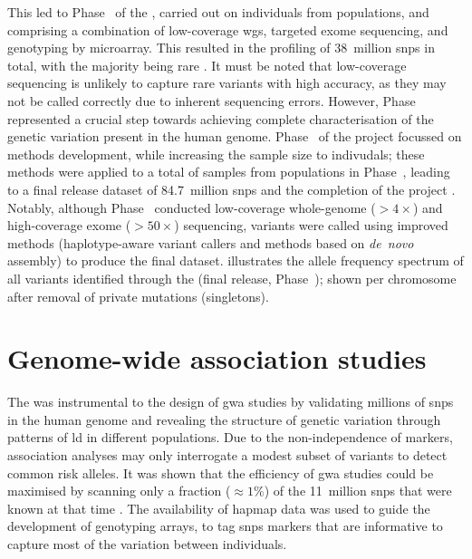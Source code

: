 This led to Phase~ of the , carried out on  individuals from  populations, and comprising a combination of low-coverage \gls{wgs}, targeted exome sequencing, and genotyping by microarray.
This resulted in the profiling of 38~million \glspl{snp} in total, with the majority being rare \citep{GenomesProjectConsortium:2012co}.
It must be noted that low-coverage sequencing is unlikely to capture rare variants with high accuracy, as they may not be called correctly due to inherent sequencing errors.
However, Phase~ represented a crucial step towards achieving complete characterisation of the genetic variation present in the human genome.
Phase~ of the project focussed on methods development, while increasing the sample size to  indivudals; these methods were applied to a total of  samples from  populations in Phase~, leading to a final release dataset of 84.7~million \glspl{snp} and the completion of the project \citep{Auton:2015gk}.
Notably, although Phase~ conducted low-coverage whole-genome ($>4\times$) and high-coverage exome ($>50\times$) sequencing, variants were called using improved methods (\eg haplotype-aware variant callers and methods based on \emph{de~novo} assembly) to produce the final dataset.
 illustrates the allele frequency spectrum of all variants identified through the  (final release, Phase~); shown per chromosome after removal of private mutations (singletons).



%
\section{Genome-wide association studies}
\label{sec:gwas_intro}
%

The  was instrumental to the design of \gls{gwa} studies by validating millions of \glspl{snp} in the human genome and revealing the structure of genetic variation through patterns of \gls{ld} in different populations.
Due to the non-independence of markers, association analyses may only interrogate a modest subset of variants to detect common risk alleles.
It was shown that the efficiency of \gls{gwa} studies could be maximised by scanning only a fraction (${\approx 1\%}$) of the 11~million \glspl{snp} that were known at that time \citep{deBakker:2005cy,Peer:2006bk}.
The availability of \gls{hapmap} data was used to guide the development of genotyping arrays, to tag \glspl{snp} markers that are informative to capture most of the variation between individuals.

